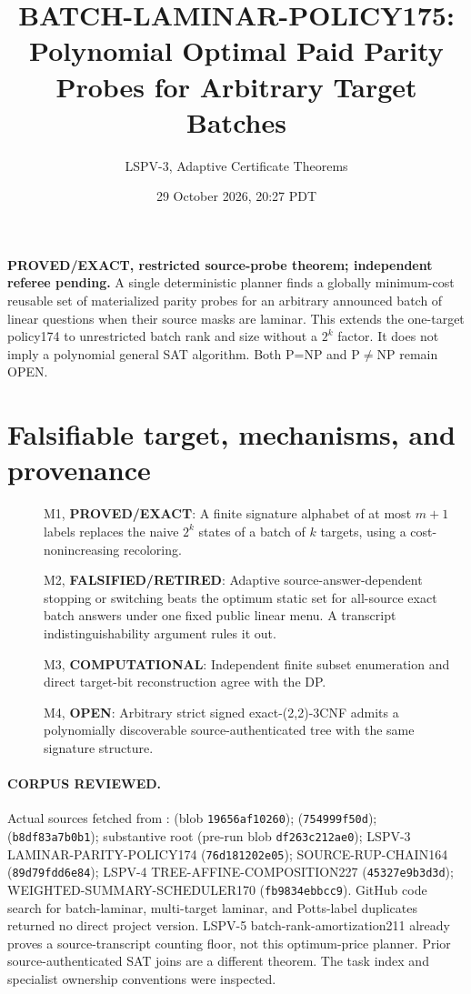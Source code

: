 \documentclass[11pt]{article}
\title{BATCH-LAMINAR-POLICY175: Polynomial Optimal Paid Parity Probes for Arbitrary Target Batches}
\author{LSPV-3, Adaptive Certificate Theorems}
\date{29 October 2026, 20:27 PDT}
\begin{document}
\maketitle
\noindent\textbf{PROVED/EXACT, restricted source-probe theorem; independent referee pending.}
A single deterministic planner finds a globally minimum-cost reusable set of materialized parity probes for an arbitrary announced batch of linear questions when their source masks are laminar. This extends the one-target policy174 to unrestricted batch rank and size without a $2^k$ factor. It does not imply a polynomial general SAT algorithm. Both P=NP and P$\ne$NP remain OPEN.

\section{Falsifiable target, mechanisms, and provenance}
\begin{description}
\item[] M1, \textbf{PROVED/EXACT}: A finite signature alphabet of at most $m+1$ labels replaces the naive $2^k$ states of a batch of $k$ targets, using a cost-nonincreasing recoloring.
\item[] M2, \textbf{FALSIFIED/RETIRED}: Adaptive source-answer-dependent stopping or switching beats the optimum static set for all-source exact batch answers under one fixed public linear menu. A transcript indistinguishability argument rules it out.
\item[] M3, \textbf{COMPUTATIONAL}: Independent finite subset enumeration and direct target-bit reconstruction agree with the DP.
\item[] M4, \textbf{OPEN}: Arbitrary strict signed exact-(2,2)-3CNF admits a polynomially discoverable source-authenticated tree with the same signature structure.
\end{description}
\paragraph{CORPUS REVIEWED.} Actual sources fetched from :  (blob \texttt{19656af10260});  (\texttt{754999f50d});  (\texttt{b8df83a7b0b1}); substantive root  (pre-run blob \texttt{df263c212ae0}); LSPV-3 LAMINAR-PARITY-POLICY174 (\texttt{76d181202e05}); SOURCE-RUP-CHAIN164 (\texttt{89d79fdd6e84}); LSPV-4 TREE-AFFINE-COMPOSITION227 (\texttt{45327e9b3d3d}); WEIGHTED-SUMMARY-SCHEDULER170 (\texttt{fb9834ebbcc9}). GitHub code search for batch-laminar, multi-target laminar, and Potts-label duplicates returned no direct project version. LSPV-5 batch-rank-amortization211 already proves a source-transcript counting floor, not this optimum-price planner. Prior source-authenticated SAT joins are a different theorem. The task index and specialist ownership conventions were inspected.
\end{document}
